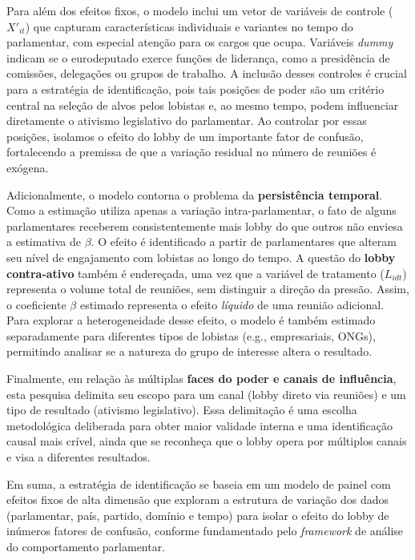 Para além dos efeitos fixos, o modelo inclui um vetor de variáveis de controle ($X'_{it}$) que capturam características individuais e variantes no tempo do parlamentar, com especial atenção para os cargos que ocupa. Variáveis \textit{dummy} indicam se o eurodeputado exerce funções de liderança, como a presidência de comissões, delegações ou grupos de trabalho. A inclusão desses controles é crucial para a estratégia de identificação, pois tais posições de poder são um critério central na seleção de alvos pelos lobistas e, ao mesmo tempo, podem influenciar diretamente o ativismo legislativo do parlamentar. Ao controlar por essas posições, isolamos o efeito do lobby de um importante fator de confusão, fortalecendo a premissa de que a variação residual no número de reuniões é exógena.

Adicionalmente, o modelo contorna o problema da \textbf{persistência temporal}. Como a estimação utiliza apenas a variação intra-parlamentar, o fato de alguns parlamentares receberem consistentemente mais lobby do que outros não enviesa a estimativa de $\beta$. O efeito é identificado a partir de parlamentares que alteram seu nível de engajamento com lobistas ao longo do tempo. A questão do \textbf{lobby contra-ativo} também é endereçada, uma vez que a variável de tratamento ($L_{idt}$) representa o volume total de reuniões, sem distinguir a direção da pressão. Assim, o coeficiente $\beta$ estimado representa o efeito \textit{líquido} de uma reunião adicional. Para explorar a heterogeneidade desse efeito, o modelo é também estimado separadamente para diferentes tipos de lobistas (e.g., empresariais, ONGs), permitindo analisar se a natureza do grupo de interesse altera o resultado.

Finalmente, em relação às múltiplas \textbf{faces do poder e canais de influência}, esta pesquisa delimita seu escopo para um canal (lobby direto via reuniões) e um tipo de resultado (ativismo legislativo). Essa delimitação é uma escolha metodológica deliberada para obter maior validade interna e uma identificação causal mais crível, ainda que se reconheça que o lobby opera por múltiplos canais e visa a diferentes resultados.

Em suma, a estratégia de identificação se baseia em um modelo de painel com efeitos fixos de alta dimensão que exploram a estrutura de variação dos dados (parlamentar, país, partido, domínio e tempo) para isolar o efeito do lobby de inúmeros fatores de confusão, conforme fundamentado pelo \textit{framework} de análise do comportamento parlamentar.